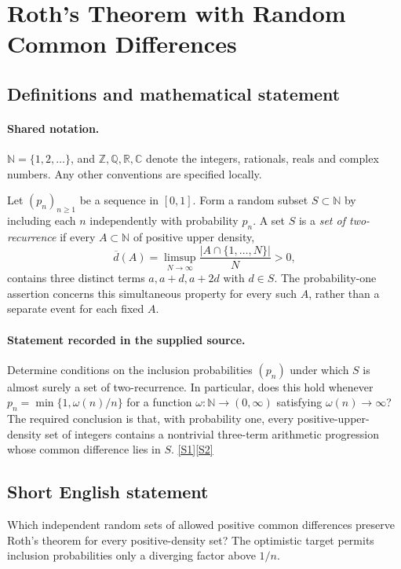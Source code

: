 \documentclass[11pt]{article}
\newcommand{\sref}[2]{\hyperlink{source:#1:#2}{[S#2]}}
\begin{document}
\section{Roth's Theorem with Random Common Differences}\label{statement}

\subsection{Definitions and mathematical statement}

\paragraph{Shared notation.}$\mathbb N=\{1,2,\ldots\}$, and $\mathbb Z,\mathbb Q,\mathbb R,\mathbb C$ denote the integers, rationals, reals and complex numbers. Any other conventions are specified locally.


Let $(p_n)_{n\ge1}$ be a sequence in $[0,1]$. Form a random subset $S\subset\mathbb N$ by including each $n$ independently with probability $p_n$. A set $S$ is a \emph{set of two-recurrence} if every $A\subset\mathbb N$ of positive upper density,
\[
\overline d(A)=\limsup_{N\to\infty}\frac{|A\cap\{1,\ldots,N\}|}{N}>0,
\]
contains three distinct terms $a,a+d,a+2d$ with $d\in S$. The probability-one assertion concerns this simultaneous property for every such $A$, rather than a separate event for each fixed $A$.
\paragraph{Statement recorded in the supplied source.}
Determine conditions on the inclusion probabilities $(p_n)$ under which $S$ is almost surely a set of two-recurrence. In particular, does this hold whenever $p_n=\min\{1,\omega(n)/n\}$ for a function $\omega:\mathbb N\to(0,\infty)$ satisfying $\omega(n)\to\infty$? The required conclusion is that, with probability one, every positive-upper-density set of integers contains a nontrivial three-term arithmetic progression whose common difference lies in $S$. \sref{statement}{1}\sref{statement}{2}
\subsection{Short English statement}
Which independent random sets of allowed positive common differences preserve Roth's theorem for every positive-density set? The optimistic target permits inclusion probabilities only a diverging factor above $1/n$.
\end{document}
